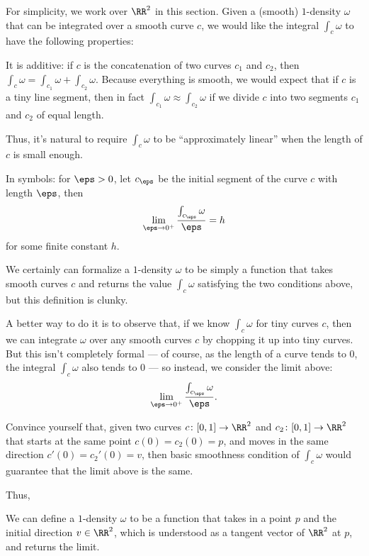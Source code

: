 For simplicity, we work over $\RR^2$ in this section.
Given a (smooth) $1$-density $\omega$ that can be integrated over a smooth curve $c$,
we would like the integral $\int_c \omega$ to have the following properties:
\begin{itemize}
	\ii It is additive: if $c$ is the concatenation of two curves $c_1$ and $c_2$, then
	$\int_c \omega = \int_{c_1} \omega + \int_{c_2} \omega$.
	\ii Because everything is smooth, we would expect that if $c$ is a tiny line segment,
	then in fact $\int_{c_1} \omega \approx \int_{c_2} \omega$ if we divide $c$ into two segments
	$c_1$ and $c_2$ of equal length.

	Thus, it's natural to require $\int_c \omega$ to be ``approximately linear'' when the length of
	$c$ is small enough.

	In symbols: for $\eps > 0$, let $c_\eps$ be the initial segment of the curve $c$ with length
	$\eps$, then
	\[ \lim_{\eps \to 0^+} \frac{\int_{c_\eps} \omega}{\eps} = h \]
	for some finite constant $h$.
\end{itemize}

We certainly can formalize a $1$-density $\omega$ to be simply a function that takes smooth curves
$c$ and returns the value $\int_c \omega$ satisfying the two conditions above, but this definition
is clunky.

A better way to do it is to observe that, if we know $\int_c \omega$ for tiny curves $c$, then we
can integrate $\omega$ over any smooth curves $c$ by chopping it up into tiny curves.
But this isn't completely formal --- of course, as the length of a curve tends to $0$, the integral
$\int_c \omega$ also tends to 0 --- so instead, we consider the limit above:
\[ \lim_{\eps \to 0^+} \frac{\int_{c_\eps} \omega}{\eps}. \]

\begin{ques}
	Convince yourself that, given two curves $c \colon [0, 1] \to \RR^2$ and $c_2 \colon [0, 1] \to
	\RR^2$ that starts at the same point $c(0) = c_2(0) = p$,
	and moves in the same direction $c'(0) = c_2'(0) = v$, then basic smoothness condition of
	$\int_c \omega$ would guarantee that the limit above is the same.
\end{ques}

Thus,
\begin{moral}
We can define a $1$-density $\omega$ to be a function that takes in a point $p$ and the initial
direction $v \in \RR^2$, which is understood as a tangent vector of $\RR^2$ at $p$, and returns
the limit.
\end{moral}

